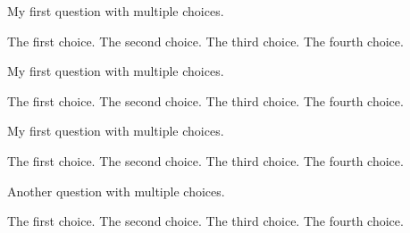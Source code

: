 \documentclass{exam}
\begin{document}
\begin{questions}


\begin{minipage}{\linewidth}
    \question My first question with multiple choices.

    \begin{choices}
      \choice The first choice.
      \choice The second choice.
      \choice The third choice.
      \choice The fourth choice.
    \end{choices}

\end{minipage}


\begin{minipage}{\linewidth}

\question My first question with multiple choices.

  \begin{oneparchoices}
    \choice The first choice.
    \choice The second choice.
    \choice The third choice.
    \choice The fourth choice.
  \end{oneparchoices}

  \end{minipage}


\begin{minipage}{\linewidth}

  \question My first question with multiple choices.
\begin{checkboxes}
    \choice The first choice.
    \choice The second choice.
    \choice The third choice.
    \choice The fourth choice.
\end{checkboxes}
\end{minipage}


\begin{minipage}{\linewidth}

\question Another question with multiple choices.

\begin{oneparcheckboxes}
    \choice The first choice.
    \choice The second choice.
    \choice The third choice.
    \choice The fourth choice.
\end{oneparcheckboxes}


\end{minipage}
\end{questions}
\end{document}
